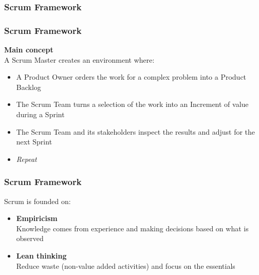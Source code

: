 \begin{frame}
	\frametitle{Scrum Framework}
\end{frame}

\begin{frame}
	\frametitle{Scrum Framework}
	\textbf{Main concept}\\
	\vspace{0.5em}
	A Scrum Master creates an environment where:
	\vspace{0.5em}
	\begin{itemize}
		\item A Product Owner orders the work for a complex problem into a Product Backlog
		\item The Scrum Team turns a selection of the work into an Increment of value during a Sprint
		\item The Scrum Team and its stakeholders inspect the results and adjust for the next Sprint
		\item \textit{Repeat}
	\end{itemize}
\end{frame}

\begin{frame}
	\frametitle{Scrum Framework}
	Scrum is founded on:
	\vspace{1em}
	\begin{itemize}
		\setlength\itemsep{0.7em}
		\item<1-> \textbf{Empiricism}\\
		Knowledge comes from experience and making decisions based on what is observed
		\item<2-> \textbf{Lean thinking}\\
		Reduce waste (non-value added activities) and focus on the essentials
	\end{itemize}
\end{frame}

